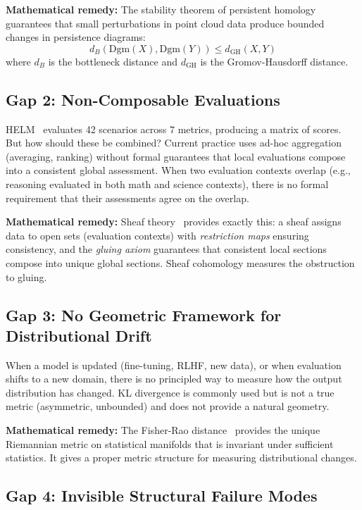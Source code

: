 \documentclass[11pt]{article}
\newcommand{\dgm}{\mathrm{Dgm}}
\newcommand{\bott}{d_B}
\begin{document}
\textbf{Mathematical remedy:} The stability theorem of persistent homology~\cite{chazal2021introduction} guarantees that small perturbations in point cloud data produce bounded changes in persistence diagrams:
\begin{equation}
\bott(\dgm(X), \dgm(Y)) \leq d_{\mathrm{GH}}(X, Y)
\end{equation}
where $\bott$ is the bottleneck distance and $d_{\mathrm{GH}}$ is the Gromov-Hausdorff distance.

\subsection{Gap 2: Non-Composable Evaluations}

HELM~\cite{liang2022helm} evaluates 42 scenarios across 7 metrics, producing a matrix of scores. But how should these be combined? Current practice uses ad-hoc aggregation (averaging, ranking) without formal guarantees that local evaluations compose into a consistent global assessment. When two evaluation contexts overlap (e.g., reasoning evaluated in both math and science contexts), there is no formal requirement that their assessments agree on the overlap.

\textbf{Mathematical remedy:} Sheaf theory~\cite{bredon1997sheaf} provides exactly this: a sheaf assigns data to open sets (evaluation contexts) with \emph{restriction maps} ensuring consistency, and the \emph{gluing axiom} guarantees that consistent local sections compose into unique global sections. Sheaf cohomology measures the obstruction to gluing.

\subsection{Gap 3: No Geometric Framework for Distributional Drift}

When a model is updated (fine-tuning, RLHF, new data), or when evaluation shifts to a new domain, there is no principled way to measure how the output distribution has changed. KL divergence is commonly used but is not a true metric (asymmetric, unbounded) and does not provide a natural geometry.

\textbf{Mathematical remedy:} The Fisher-Rao distance~\cite{nielsen2020elementary} provides the unique Riemannian metric on statistical manifolds that is invariant under sufficient statistics. It gives a proper metric structure for measuring distributional changes.

\subsection{Gap 4: Invisible Structural Failure Modes}
\end{document}
